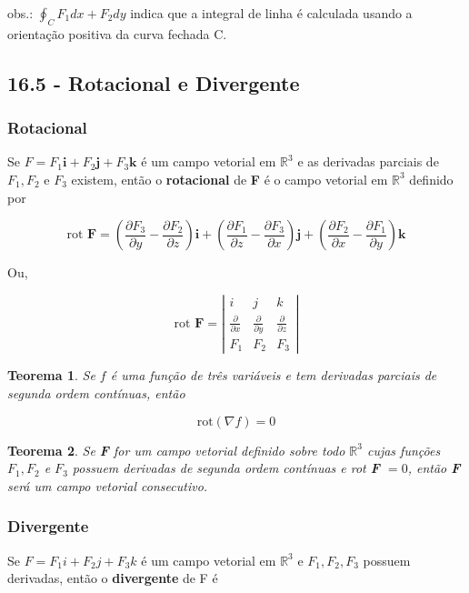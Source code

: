 \documentclass[12pt]{article}
\newtheorem{theorem}{Teorema}[section]
\begin{document}
obs.: $\oint_C F_1 d x + F_2 d y$ indica que a integral de linha é calculada usando a orientação positiva da curva fechada C.

\subsection*{16.5 - Rotacional e Divergente}
\label{s6}

\subsubsection*{Rotacional}
Se $F = F_1 \textbf{i} + F_2 \textbf{j} + F_3 \textbf{k}$ é um campo vetorial em $\mathbb{R}^3$ e as derivadas parciais de $F_1, F_2$ e $F_3$ existem, então o \textbf{rotacional} de \textbf{F} é o campo vetorial em $\mathbb{R}^3$ definido por

$$\text{rot } \textbf{F} = \left( \dfrac{\partial F_3}{\partial y} - \dfrac{\partial F_2}{\partial z} \right) \textbf{i} + \left( \dfrac{\partial F_1}{\partial z} - \dfrac{\partial F_3}{\partial x} \right) \textbf{j} + \left( \dfrac{\partial F_2}{\partial x} - \dfrac{\partial F_1}{\partial y} \right) \textbf{k}$$

Ou,

$$\text{rot } \textbf{F} = \left| \begin{array}{ccc}
    i & j & k \\
    \frac{\partial}{\partial x} & \frac{\partial}{\partial y} & \frac{\partial}{\partial z} \\
    F_1 & F_2 & F_3
\end{array} \right|$$

\begin{theorem}
    Se $f$ é uma função de três variáveis e tem derivadas parciais de segunda ordem contínuas, então

    $$\text{rot} (\nabla f) = 0$$
\end{theorem}

\begin{theorem}
    Se \textbf{F} for um campo vetorial definido sobre todo $\mathbb{R}^3$ cujas funções $F_1, F_2$ e $F_3$ possuem derivadas de segunda ordem contínuas e rot \textbf{F} $ = 0$, então \textbf{F} será um campo vetorial consecutivo.
\end{theorem}

\subsubsection*{Divergente}
Se $F = F_1 i + F_2 j + F_3 k$ é um campo vetorial em $\mathbb{R}^3$ e $F_1, F_2, F_3$ possuem derivadas, então o \textbf{divergente} de F é
\end{document}
